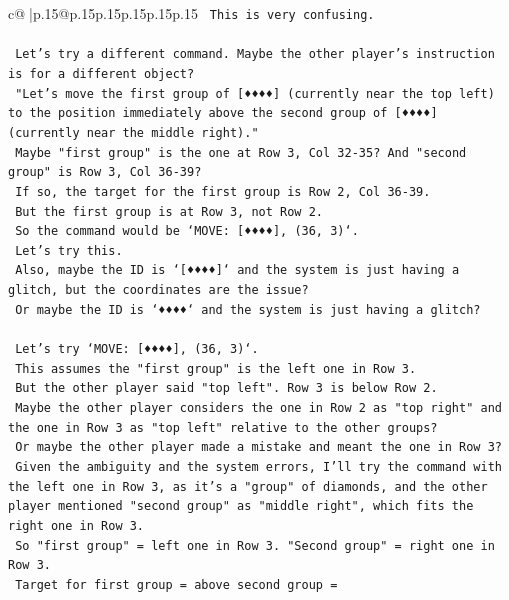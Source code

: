 \documentclass{article}
\begin{document}
{\begin{supertabular}{c@{$\;$}|p{.15\linewidth}@{}p{.15\linewidth}p{.15\linewidth}p{.15\linewidth}p{.15\linewidth}p{.15\linewidth}}
{{{\texttt{    This is very confusing.} \\
\\ 
\texttt{    Let's try a different command. Maybe the other player's instruction is for a different object?} \\
\texttt{    "Let's move the first group of {[}♦♦♦♦{]} (currently near the top left) to the position immediately above the second group of {[}♦♦♦♦{]} (currently near the middle right)."} \\
\texttt{    Maybe "first group" is the one at Row 3, Col 32{-}35? And "second group" is Row 3, Col 36{-}39?} \\
\texttt{    If so, the target for the first group is Row 2, Col 36{-}39.} \\
\texttt{    But the first group is at Row 3, not Row 2.} \\
\texttt{    So the command would be `MOVE: {[}♦♦♦♦{]}, (36, 3)`.} \\
\texttt{    Let's try this.} \\
\texttt{    Also, maybe the ID is `{[}♦♦♦♦{]}` and the system is just having a glitch, but the coordinates are the issue?} \\
\texttt{    Or maybe the ID is `♦♦♦♦` and the system is just having a glitch?} \\
\\ 
\texttt{    Let's try `MOVE: {[}♦♦♦♦{]}, (36, 3)`.} \\
\texttt{    This assumes the "first group" is the left one in Row 3.} \\
\texttt{    But the other player said "top left". Row 3 is below Row 2.} \\
\texttt{    Maybe the other player considers the one in Row 2 as "top right" and the one in Row 3 as "top left" relative to the other groups?} \\
\texttt{    Or maybe the other player made a mistake and meant the one in Row 3?} \\
\texttt{    Given the ambiguity and the system errors, I'll try the command with the left one in Row 3, as it's a "group" of diamonds, and the other player mentioned "second group" as "middle right", which fits the right one in Row 3.} \\
\texttt{    So "first group" = left one in Row 3. "Second group" = right one in Row 3.} \\
\texttt{    Target for first group = above second group =} \\
            }
        }
    }
     \\ \\


\end{supertabular}}
\end{document}
